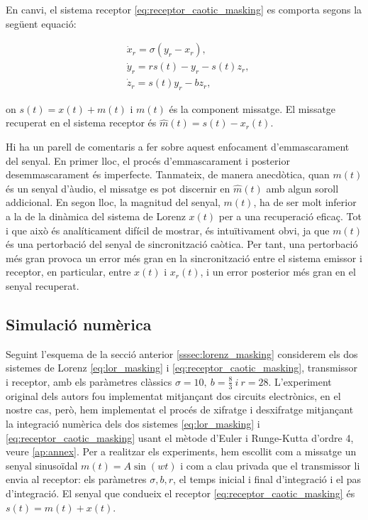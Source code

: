 \documentclass[11pt,a4paper,openright,oneside]{article}
\numberwithin{equation}{section}
\theoremstyle{definition}
\begin{document}
En canvi, el sistema receptor \eqref{eq:receptor_caotic_masking} es comporta segons la següent equació:

\begin{equation} \begin{aligned}  \label{eq:receptor_caotic_masking}
    &\dot{x}_r = \sigma(y_r-x_r), \\
    &\dot{y}_r = rs(t)-y_r-s(t)z_r, \\
    &\dot{z}_r = s(t)y_r-bz_r,
\end{aligned}\end{equation}

on $s(t)=x(t)+m(t)$ i $m(t)$ és la component missatge. El missatge recuperat en el sistema receptor és $\hat{m}(t)=s(t)-x_r(t)$.

Hi ha un parell de comentaris a fer sobre aquest enfocament d'emmascarament del senyal. En primer lloc, el procés d'emmascarament i posterior desemmascarament és imperfecte. Tanmateix, de manera anecdòtica, quan $m(t)$ és un senyal d'àudio, el missatge es pot discernir en $\hat{m}(t)$ amb algun soroll addicional. En segon lloc, la magnitud del senyal, $m(t)$, ha de ser molt inferior a la de la dinàmica del sistema de Lorenz $x(t)$ per a una recuperació eficaç. Tot i que això és analíticament difícil de mostrar, és intuïtivament obvi,  ja que $m(t)$ és una pertorbació del senyal de sincronització caòtica. Per tant, una pertorbació més gran provoca un error més gran en la sincronització entre el sistema emissor i receptor, en particular, entre $x(t)$ i $x_r(t)$, i un error posterior més gran en el senyal recuperat.

\subsection{Simulació numèrica} \label{sssec: sim_numerica}

Seguint l'esquema de la secció anterior \ref{sssec:lorenz_masking} considerem els dos sistemes de Lorenz \eqref{eq:lor_masking} i \eqref{eq:receptor_caotic_masking}, transmissor i receptor, amb els paràmetres clàssics $\sigma=10, \ b=\frac{8}{3} \ i \ r=28$. L'experiment original dels autors \cite{Cuomo} fou implementat mitjançant dos circuits electrònics, en el nostre cas, però, hem implementat el procés de xifratge i desxifratge mitjançant la integració numèrica dels dos sistemes \eqref{eq:lor_masking} i \eqref{eq:receptor_caotic_masking} usant el mètode d'Euler i Runge-Kutta d'ordre 4, veure \ref{ap:annex}. Per a realitzar els experiments, hem escollit com a missatge un senyal sinusoïdal $m(t)=A\sin(wt)$ i com a clau privada que el transmissor li envia al receptor: els paràmetres $\sigma,b, r$, el temps inicial i final d'integració i el pas d'integració. El senyal que condueix el receptor \eqref{eq:receptor_caotic_masking} és $s(t)=m(t)+x(t)$. 
\end{document}
